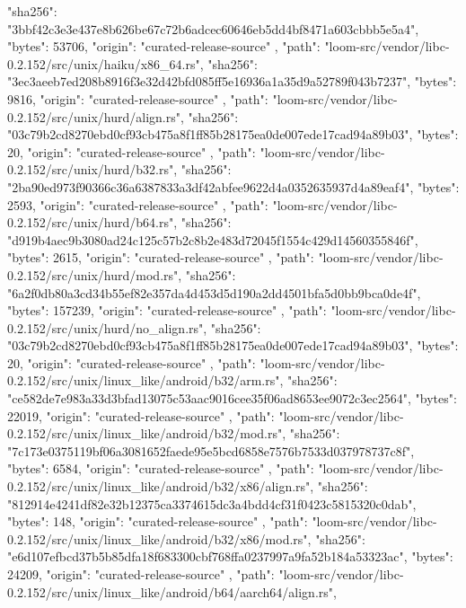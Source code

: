 {{      "sha256": "3bbf42c3e3e437e8b626be67c72b6adcec60646eb5dd4bf8471a603cbbb5e5a4",
      "bytes": 53706,
      "origin": "curated-release-source"
    },
    {
      "path": "loom-src/vendor/libc-0.2.152/src/unix/haiku/x86_64.rs",
      "sha256": "3ec3aeeb7ed208b8916f3e32d42bfd085ff5e16936a1a35d9a52789f043b7237",
      "bytes": 9816,
      "origin": "curated-release-source"
    },
    {
      "path": "loom-src/vendor/libc-0.2.152/src/unix/hurd/align.rs",
      "sha256": "03c79b2cd8270ebd0cf93cb475a8f1ff85b28175ea0de007ede17cad94a89b03",
      "bytes": 20,
      "origin": "curated-release-source"
    },
    {
      "path": "loom-src/vendor/libc-0.2.152/src/unix/hurd/b32.rs",
      "sha256": "2ba90ed973f90366c36a6387833a3df42abfee9622d4a0352635937d4a89eaf4",
      "bytes": 2593,
      "origin": "curated-release-source"
    },
    {
      "path": "loom-src/vendor/libc-0.2.152/src/unix/hurd/b64.rs",
      "sha256": "d919b4aec9b3080ad24c125c57b2c8b2e483d72045f1554c429d14560355846f",
      "bytes": 2615,
      "origin": "curated-release-source"
    },
    {
      "path": "loom-src/vendor/libc-0.2.152/src/unix/hurd/mod.rs",
      "sha256": "6a2f0db80a3cd34b55ef82e357da4d453d5d190a2dd4501bfa5d0bb9bca0de4f",
      "bytes": 157239,
      "origin": "curated-release-source"
    },
    {
      "path": "loom-src/vendor/libc-0.2.152/src/unix/hurd/no_align.rs",
      "sha256": "03c79b2cd8270ebd0cf93cb475a8f1ff85b28175ea0de007ede17cad94a89b03",
      "bytes": 20,
      "origin": "curated-release-source"
    },
    {
      "path": "loom-src/vendor/libc-0.2.152/src/unix/linux_like/android/b32/arm.rs",
      "sha256": "ce582de7e983a33d3bfad13075c53aac9016cee35f06ad8653ee9072c3ec2564",
      "bytes": 22019,
      "origin": "curated-release-source"
    },
    {
      "path": "loom-src/vendor/libc-0.2.152/src/unix/linux_like/android/b32/mod.rs",
      "sha256": "7c173e0375119bf06a3081652faede95e5bcd6858e7576b7533d037978737c8f",
      "bytes": 6584,
      "origin": "curated-release-source"
    },
    {
      "path": "loom-src/vendor/libc-0.2.152/src/unix/linux_like/android/b32/x86/align.rs",
      "sha256": "812914e4241df82e32b12375ca3374615dc3a4bdd4cf31f0423c5815320c0dab",
      "bytes": 148,
      "origin": "curated-release-source"
    },
    {
      "path": "loom-src/vendor/libc-0.2.152/src/unix/linux_like/android/b32/x86/mod.rs",
      "sha256": "e6d107efbcd37b5b85dfa18f683300cbf768ffa0237997a9fa52b184a53323ac",
      "bytes": 24209,
      "origin": "curated-release-source"
    },
    {
      "path": "loom-src/vendor/libc-0.2.152/src/unix/linux_like/android/b64/aarch64/align.rs",
}}
